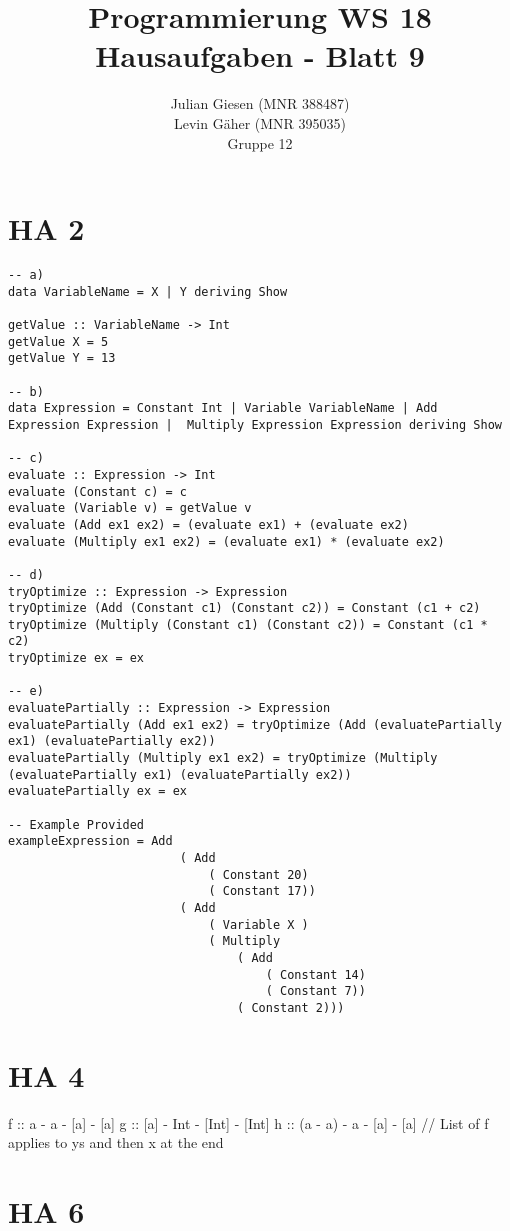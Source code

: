 \documentclass[a4paper]{article}
\title{ Programmierung WS 18 \\ Hausaufgaben - Blatt 9 }
\author{ Julian Giesen (MNR 388487) \\
Levin Gäher (MNR 395035) \\
Gruppe 12 }
\date{  }
\begin{document}
\maketitle

\section*{ HA 2 }

\begin{lstlisting}
-- a)
data VariableName = X | Y deriving Show

getValue :: VariableName -> Int
getValue X = 5
getValue Y = 13

-- b)
data Expression = Constant Int | Variable VariableName | Add Expression Expression |  Multiply Expression Expression deriving Show

-- c)
evaluate :: Expression -> Int
evaluate (Constant c) = c
evaluate (Variable v) = getValue v
evaluate (Add ex1 ex2) = (evaluate ex1) + (evaluate ex2)
evaluate (Multiply ex1 ex2) = (evaluate ex1) * (evaluate ex2)

-- d)
tryOptimize :: Expression -> Expression
tryOptimize (Add (Constant c1) (Constant c2)) = Constant (c1 + c2)
tryOptimize (Multiply (Constant c1) (Constant c2)) = Constant (c1 * c2)
tryOptimize ex = ex

-- e)
evaluatePartially :: Expression -> Expression
evaluatePartially (Add ex1 ex2) = tryOptimize (Add (evaluatePartially ex1) (evaluatePartially ex2))
evaluatePartially (Multiply ex1 ex2) = tryOptimize (Multiply (evaluatePartially ex1) (evaluatePartially ex2))
evaluatePartially ex = ex

-- Example Provided
exampleExpression = Add
						( Add
							( Constant 20)
							( Constant 17))
						( Add
							( Variable X )
							( Multiply
								( Add
									( Constant 14)
									( Constant 7))
								( Constant 2)))
\end{lstlisting}

\pagebreak

\section*{ HA 4 }

f :: a - a - [a] - [a]
g :: [a] - Int - [Int] - [Int]
h :: (a - a) - a - [a] - [a] // List of f applies to ys and then x at the end


\section*{ HA 6 }
\end{document}
